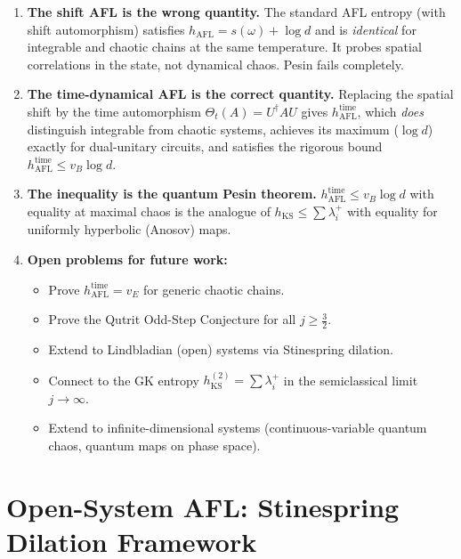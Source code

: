 \documentclass[12pt,a4paper]{article}
\begin{document}
\begin{enumerate}
\item \textbf{The shift AFL is the wrong quantity.}  The standard AFL
  entropy (with shift automorphism) satisfies $h_{\mathrm{AFL}}=s(\omega)+\log d$
  and is \emph{identical} for integrable and chaotic chains at the same
  temperature.  It probes spatial correlations in the state, not dynamical
  chaos.  Pesin fails completely.

\item \textbf{The time-dynamical AFL is the correct quantity.}
  Replacing the spatial shift by the time automorphism $\Theta_t(A)=U^{\dagger}AU$
  gives $h_{\mathrm{AFL}}^{\mathrm{time}}$, which \emph{does} distinguish
  integrable from chaotic systems, achieves its maximum ($\log d$) exactly
  for dual-unitary circuits, and satisfies the rigorous bound
  $h_{\mathrm{AFL}}^{\mathrm{time}}\leq v_B\log d$.

\item \textbf{The inequality is the quantum Pesin theorem.}
  $h_{\mathrm{AFL}}^{\mathrm{time}}\leq v_B\log d$ with equality at
  maximal chaos is the analogue of $h_{\mathrm{KS}}\leq\sum\lambda_i^+$
  with equality for uniformly hyperbolic (Anosov) maps.

\item \textbf{Open problems for future work:}
  \begin{itemize}
  \item Prove $h_{\mathrm{AFL}}^{\mathrm{time}}=v_E$ for generic chaotic chains.
  \item Prove the Qutrit Odd-Step Conjecture for all $j\geq\tfrac32$.
  \item Extend to Lindbladian (open) systems via Stinespring dilation.
  \item Connect to the GK entropy $h_{\mathrm{KS}}^{(2)}=\sum\lambda_i^+$
    in the semiclassical limit $j\to\infty$.
  \item Extend to infinite-dimensional systems (continuous-variable
    quantum chaos, quantum maps on phase space).
  \end{itemize}
\end{enumerate}

\section{Open-System AFL: Stinespring Dilation Framework}
\label{sec:stinespring_opu}
\end{document}
